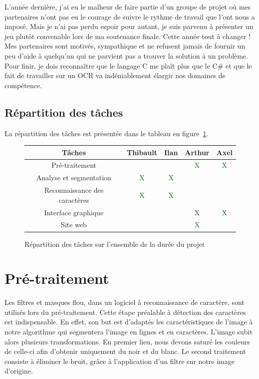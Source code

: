 \documentclass[11pt]{report}
\begin{document}
L'année dernière, j'ai eu le malheur de faire partie d'un groupe de projet où mes partenaires n'ont pas eu le courage de suivre le rythme de travail que l'ont nous a imposé. Mais je n'ai pas perdu espoir pour autant, je suis parvenu à présenter un jeu plutôt convenable lors de ma soutenance finale. Cette année tout à changer ! Mes partenaires sont motivés, sympathique et ne refusent jamais de fournir un peu d'aide à quelqu'un qui ne parvient pas a trouver la solution à un problème. Pour finir, je dois reconnaître que le langage C me plaît plus que le C\# et que le fait de travailler sur un OCR va indéniablement élargir nos domaines de compétence.

\section{Répartition des tâches}

La répartition des tâches est présentée dans le tableau en figure~\ref{tab}.

\medskip


\begin{figure}[htbp]
\centering
\begin{tabular}{ | c || c | c | c | c | }
\hline Tâches & Thibault & Ilan & Arthur & Axel \\
\hline Pré-traitement & & & \textcolor{darkgreen}{X} & \textcolor{darkgreen}{X} \\
\hline Analyse et segmentation & \textcolor{darkgreen}{X} & \textcolor{darkgreen}{X} & & \\
\hline Reconnaissance des caractères & \textcolor{darkgreen}{X} & \textcolor{darkgreen}{X} & & \\
\hline Interface graphique & & & \textcolor{darkgreen}{X} & \textcolor{darkgreen}{X} \\
\hline Site web & & & \textcolor{darkgreen}{X} & \\
\hline
\end{tabular}
\caption{Répartition des tâches sur l'ensemble de la durée du projet}
\label{tab}
\end{figure}

\chapter{Pré-traitement}

Les filtres et masques flou, dans un logiciel à reconnaissance de caractère, sont utilisés lors du pré-traitement. Cette étape préalable à détection des caractères est indispensable. En effet, son but est d’adaptés les caractéristiques de l'image à notre algorithme qui segmentera l'image en lignes et en caractères. L'image subit alors plusieurs transformations. En premier lieu, nous devons saturé les couleurs de celle-ci afin d'obtenir uniquement du noir et du blanc. Le second traitement consiste à éliminer le bruit, grâce à l'application d'un filtre sur notre image d'origine. 
\end{document}
